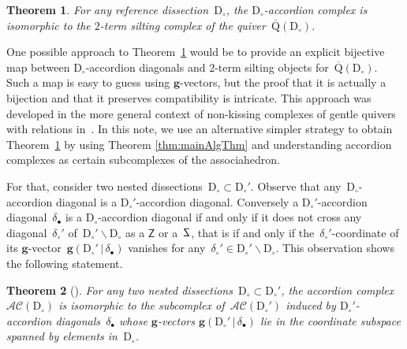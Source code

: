 \documentclass{amsart}
\newtheorem{theorem}{Theorem}%
\theoremstyle{definition}
\renewcommand{\b}[1]{\mathbf{#1}} %
\newcommand{\ssm}{\smallsetminus} %
\newcommand{\dissection}{\mathrm{D}} %
\newcommand{\accordionComplex}{\mathcal{AC}} %
\newcommand{\SSS}{\reflectbox{$\mathsf{Z}$}} %
\newcommand{\ZZZ}{\mathsf{Z}} %
\newcommand{\gvector}[2]{\mathbf{g}(#1 \,|\, #2)} %
\newcommand{\quiver}{\mathrm{Q}} %
\begin{document}
\begin{theorem}
\label{thm:bijectionAccordionComplexSiltingComplex}
For any reference dissection~$\dissection_\circ$, the $\dissection_\circ$-accordion complex is isomorphic to the $2$-term silting complex of the quiver~$\overline{\quiver}(\dissection_\circ)$.
\end{theorem}

One possible approach to Theorem~\ref{thm:bijectionAccordionComplexSiltingComplex} would be to provide an explicit bijective map between $\dissection_\circ$-accordion diagonals and $2$-term silting objects for~$\overline{\quiver}(\dissection_\circ)$.
Such a map is easy to guess using \mbox{$\b{g}$-vectors}, but the proof that it is actually a bijection and that it preserves compatibility is intricate.
This approach was developed in the more general context of non-kissing complexes of gentle quivers with relations in~\cite[Proposition 4.43]{PaluPilaudPlamondon}.
In this note, we use an alternative simpler strategy to obtain Theorem~\ref{thm:bijectionAccordionComplexSiltingComplex} by using Theorem \ref{thm:mainAlgThm} and understanding accordion complexes as certain subcomplexes of the associahedron.

For that, consider two nested dissections~$\dissection_\circ \subset \dissection_\circ'$.
Observe that any~$\dissection_\circ$-accordion diagonal is a $\dissection_\circ'$-accordion diagonal.
Conversely a $\dissection_\circ'$-accordion diagonal~$\delta_\bullet$ is a $\dissection_\circ$-accordion diagonal if and only if it does not cross any diagonal~$\delta_\circ'$ of~$\dissection_\circ' \ssm \dissection_\circ$ as a $\ZZZ$ or a~$\SSS$, that is if and only if the~$\delta_\circ'$-coordinate of its $\b{g}$-vector~$\gvector{\dissection_\circ'}{\delta_\bullet}$ vanishes for any~$\delta_\circ' \in \dissection_\circ' \ssm \dissection_\circ$.
This observation shows the following statement.

\begin{theorem}[{\cite[Sect.~4.2]{MannevillePilaud-accordion}}]
\label{thm:contractDiagonals}
For any two nested dissections~$\dissection_\circ \subset \dissection_\circ'$, the accordion complex~$\accordionComplex(\dissection_\circ)$ is isomorphic to the subcomplex of~$\accordionComplex(\dissection_\circ')$ induced by $\dissection_\circ'$-accordion diagonals~$\delta_\bullet$ whose $\b{g}$-vectors $\gvector{\dissection_\circ'}{\delta_\bullet}$ lie in the coordinate subspace spanned by elements in~$\dissection_\circ$.
\end{theorem}
\end{document}
